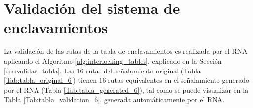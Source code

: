 \section{Validación del sistema de enclavamientos}

    La validación de las rutas de la tabla de enclavamientos es realizada por el RNA aplicando el Algoritmo \ref{alg:interlocking_tables}, explicado en la Sección \ref{sec:validar_tabla}. Las 16 rutas del señalamiento original (Tabla \ref{Tab:tabla_original_6}) tienen 16 rutas equivalentes en el señalamiento generado por el RNA (Tabla \ref{Tab:tabla_generated_6}), tal como se puede visualizar en la Tabla \ref{Tab:tabla_validation_6}, generada automáticamente por el RNA.

    \begin{table}[H]
        {
        \caption{Equivalencias entre las rutas originales y las generadas por el RNA.}
        \label{Tab:tabla_validation_6}
        \begin{center}
\end{center}}
\end{table}
